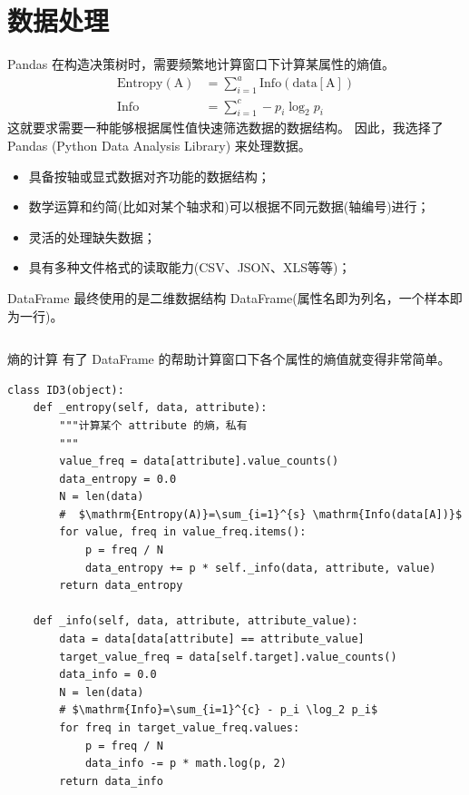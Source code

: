 \documentclass[10pt]{beamer}
\begin{document}
\section{数据处理}

\begin{frame}[fragile]{Pandas}
在构造决策树时，需要频繁地计算窗口下计算某属性的熵值。
\begin{align}
  \mathrm{Entropy(A)}&=\sum_{i=1}^{a} \mathrm{Info(data[A])} \\
  \mathrm{Info}&=\sum_{i=1}^{c} - p_i \log_2 p_i
\end{align}
这就要求需要一种能够根据属性值快速筛选数据的数据结构。
因此，我选择了\alert{Pandas (Python Data Analysis Library)} 来处理数据。
\begin{itemize}
  \item 具备按轴或显式数据对齐功能的数据结构；
  \item 数学运算和约简(比如对某个轴求和)可以根据不同元数据(轴编号)进行；
  \item 灵活的处理缺失数据；
  \item 具有多种文件格式的读取能力(CSV、JSON、XLS等等)；
\end{itemize}
\end{frame}

\begin{frame}[fragile]{DataFrame}
最终使用的是二维数据结构 DataFrame(属性名即为列名，一个样本即为一行)。
\inputminted[mathescape,linenos,frame=lines,framesep=2mm,breaklines,breakautoindent,fontsize=\small]{Python}{./codes/pandas_demo.py}
\end{frame}

\begin{frame}{熵的计算}
有了 DataFrame 的帮助计算窗口下各个属性的熵值就变得非常简单。
\begin{verbatim}
class ID3(object):
    def _entropy(self, data, attribute):
        """计算某个 attribute 的熵，私有
        """
        value_freq = data[attribute].value_counts()
        data_entropy = 0.0
        N = len(data)
        #  $\mathrm{Entropy(A)}=\sum_{i=1}^{s} \mathrm{Info(data[A])}$
        for value, freq in value_freq.items():
            p = freq / N
            data_entropy += p * self._info(data, attribute, value)
        return data_entropy

    def _info(self, data, attribute, attribute_value):
        data = data[data[attribute] == attribute_value]
        target_value_freq = data[self.target].value_counts()
        data_info = 0.0
        N = len(data)
        # $\mathrm{Info}=\sum_{i=1}^{c} - p_i \log_2 p_i$
        for freq in target_value_freq.values:
            p = freq / N
            data_info -= p * math.log(p, 2)
        return data_info                
\end{verbatim}
\end{frame}
\end{document}
